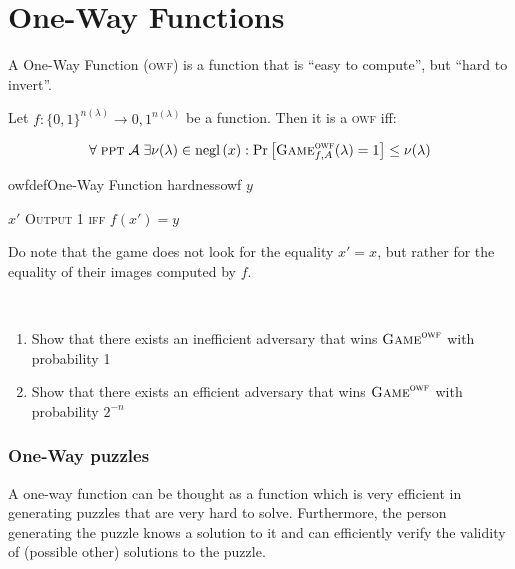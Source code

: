 \section{One-Way Functions}

A One-Way Function (\textsc{owf}) is a function that is ``easy to compute'', but ``hard to invert''.

\begin{definition}    
    Let $f : \{0,1\}^{n(\lambda)} \to {0,1}^{n(\lambda)}$ be a function. Then it is a \textsc{owf} iff:

    \begin{equation}
        \forall\; \textsc{ppt}\; \mathcal{A}\;
        \exists\nu(\lambda) \in \mathrm{negl}\left({x}\right) :
        \Pr \left[ \textsc{Game}_{f,A}^\textsc{owf} (\lambda) = 1 \right]
        \leq \nu(\lambda)
    \end{equation}

\end{definition}


\begin{cryptogame}{owfdef}{One-Way Function hardness}{owf}
    {$y$}
    {}

    \postlevel

    \send{}
    {$x'$}
    {\textsc{Output 1 iff} $f(x')=y$}

\end{cryptogame}

Do note that the game does not look for the equality $x' = x$, but rather for the equality of their images computed by $f$.

\pagebreak

\begin{exercise}
    \
    \begin{enumerate}
        \item Show that there exists an inefficient adversary that wins $\textsc{Game}^\textsc{owf}$ with probability 1
        \item Show that there exists an efficient adversary that wins $\textsc{Game}^\textsc{owf}$ with probability $2^{-n}$
    \end{enumerate}
\end{exercise}


\subsubsection{One-Way puzzles}
A one-way function can be thought as a function which is very efficient in generating puzzles that are very hard to solve. Furthermore, the person generating the puzzle knows a solution to it and can efficiently verify the validity of (possible other) solutions to the puzzle.

